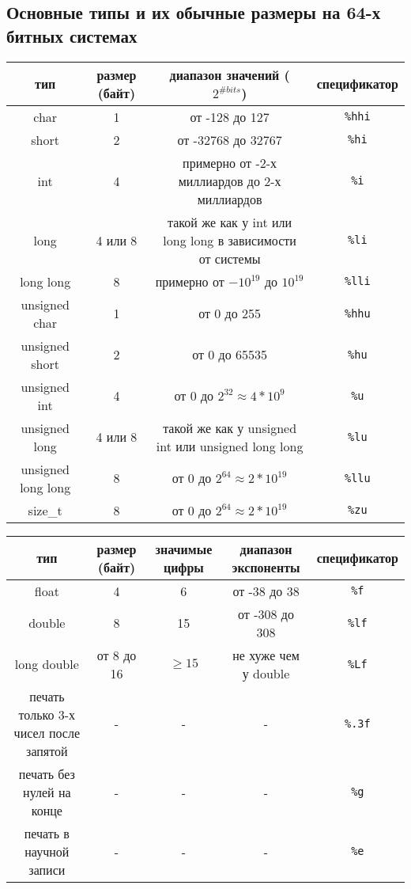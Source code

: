 \documentclass{article}
\begin{document}
\subsection*{Основные типы и их обычные размеры на 64-х битных системах}
\begin{center}
\begin{tabular}{ c c c c }
 тип & размер (байт) & диапазон значений ($2^{\# bits}$) & спецификатор \\ \hline
 char & 1 & от -128 до 127 & \texttt{\%hhi} \\ 
 short & 2 & от -32768 до 32767 & \texttt{\%hi}  \\  
 int & 4 & примерно от -2-х миллиардов до 2-х миллиардов & \texttt{\%i}  \\  
 long & 4 или 8 & такой же как у int или long long в зависимости от системы & \texttt{\%li}  \\  
 long long & 8 & примерно от $-10^{19}$ до $10^{19}$ & \texttt{\%lli}  \\  
 unsigned char & 1 & от 0 до 255 & \texttt{\%hhu} \\ 
 unsigned short & 2 & от 0 до 65535 & \texttt{\%hu}  \\  
 unsigned int & 4 & от 0 до $2^{32} \approx 4*10^{9}$ & \texttt{\%u}  \\  
 unsigned long & 4 или 8 & такой же как у unsigned int или unsigned long long & \texttt{\%lu}  \\  
 unsigned long long & 8 & от 0 до $2^{64} \approx 2*10^{19}$  & \texttt{\%llu}  \\  
 size\_t & 8 & от 0 до $2^{64} \approx 2*10^{19}$ & \texttt{\%zu} \\ \hline
\end{tabular}
\end{center}

\begin{center}
\begin{tabular}{ c c c c c }
 тип & размер (байт) & значимые цифры & диапазон экспоненты & спецификатор \\ \hline
 float             & 4          & 6  & от -38 до 38    & \texttt{\%f} \\ 
 double            & 8          & 15 & от -308 до 308  & \texttt{\%lf}  \\  
 long double       & от 8 до 16 & $\ge 15$  & не хуже чем у double  & \texttt{\%Lf}  \\ \hline
 печать только 3-х чисел после запятой & -          & -  & -              & \texttt{\%.3f} \\
 печать без нулей на конце & -          & -  & -              & \texttt{\%g} \\
 печать в научной записи   & -          & -  & -              & \texttt{\%e} \\\hline
\end{tabular}
\end{center}
\end{document}
